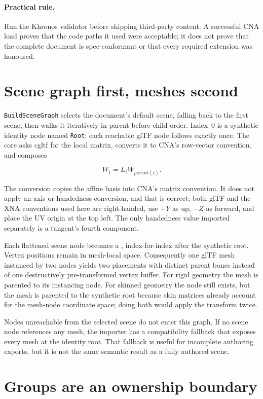 \paragraph{Practical rule.}
Run the Khronos validator before shipping third-party content. A successful CNA load proves
that the code paths it used were acceptable; it does not prove that the complete document is
spec-conformant or that every required extension was honoured.

\section{Scene graph first, meshes second}

\texttt{BuildSceneGraph} selects the document's default scene, falling back to the first scene,
then walks it iteratively in parent-before-child order. Index~0 is a synthetic identity node
named \texttt{Root}; each reachable glTF node follows exactly once. The core asks cgltf for the
local matrix, converts it to CNA's row-vector convention, and composes

\[
  W_i = L_i W_{parent(i)}.
\]

The conversion copies the affine basis into CNA's matrix convention. It does not apply an axis
or handedness conversion, and that is correct: both glTF and the XNA conventions used here are
right-handed, use $+Y$ as up, $-Z$ as forward, and place the UV origin at the top left. The
only handedness value imported separately is a tangent's fourth component.

Each flattened scene node becomes a , index-for-index after the synthetic
root. Vertex positions remain in mesh-local space. Consequently one glTF mesh instanced by two
nodes yields two  placements with distinct parent bones instead of one
destructively pre-transformed vertex buffer. For rigid geometry the mesh is parented to its
instancing node. For skinned geometry the node still exists, but the mesh is parented to the
synthetic root because skin matrices already account for the mesh-node coordinate space; doing
both would apply the transform twice.

Nodes unreachable from the selected scene do not enter this graph. If no scene node references
any mesh, the importer has a compatibility fallback that exposes every mesh at the identity
root. That fallback is useful for incomplete authoring exports, but it is not the same semantic
result as a fully authored scene.

\section{Groups are an ownership boundary}

